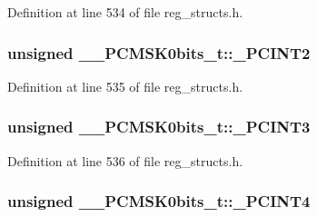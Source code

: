 Definition at line 534 of file reg\+\_\+structs.\+h.

\hypertarget{union_____p_c_m_s_k0bits__t_a784b351c789bc209abe8ff338f228b82}{
\subsubsection[{\+\_\+\+P\+C\+I\+N\+T2}]{\setlength{\rightskip}{0pt plus 5cm}unsigned \+\_\+\+\_\+\+P\+C\+M\+S\+K0bits\+\_\+t\+::\+\_\+\+P\+C\+I\+N\+T2}}\label{union_____p_c_m_s_k0bits__t_a784b351c789bc209abe8ff338f228b82}


Definition at line 535 of file reg\+\_\+structs.\+h.

\hypertarget{union_____p_c_m_s_k0bits__t_afbb36961ce199b7dd0ab29a6f5362998}{
\subsubsection[{\+\_\+\+P\+C\+I\+N\+T3}]{\setlength{\rightskip}{0pt plus 5cm}unsigned \+\_\+\+\_\+\+P\+C\+M\+S\+K0bits\+\_\+t\+::\+\_\+\+P\+C\+I\+N\+T3}}\label{union_____p_c_m_s_k0bits__t_afbb36961ce199b7dd0ab29a6f5362998}


Definition at line 536 of file reg\+\_\+structs.\+h.

\hypertarget{union_____p_c_m_s_k0bits__t_aa046bde236a4c86e2e9c21973d249e9c}{
\subsubsection[{\+\_\+\+P\+C\+I\+N\+T4}]{\setlength{\rightskip}{0pt plus 5cm}unsigned \+\_\+\+\_\+\+P\+C\+M\+S\+K0bits\+\_\+t\+::\+\_\+\+P\+C\+I\+N\+T4}}\label{union_____p_c_m_s_k0bits__t_aa046bde236a4c86e2e9c21973d249e9c}


